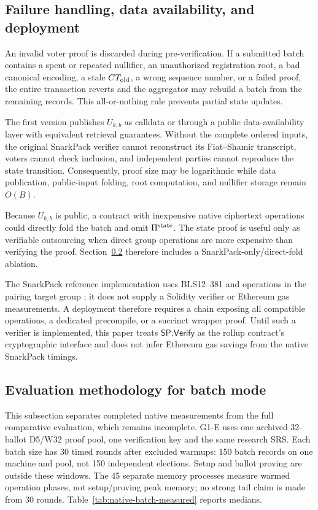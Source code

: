 \documentclass[pdflatex,sn-mathphys-num]{sn-jnl}%
\theoremstyle{thmstyleone}%
\theoremstyle{thmstyletwo}%
\theoremstyle{thmstylethree}%
\begin{document}
\subsection{Failure handling, data availability, and deployment}\label{subsec:batch-failures}

An invalid voter proof is discarded during pre-verification. If a submitted batch contains a spent or repeated nullifier, an unauthorized registration root, a bad canonical encoding, a stale $CT_{\rm old}$, a wrong sequence number, or a failed proof, the entire transaction reverts and the aggregator may rebuild a batch from the remaining records. This all-or-nothing rule prevents partial state updates.

The first version publishes $U_{k,b}$ as calldata or through a public data-availability layer with equivalent retrieval guarantees. Without the complete ordered inputs, the original SnarkPack verifier cannot reconstruct its Fiat--Shamir transcript, voters cannot check inclusion, and independent parties cannot reproduce the state transition. Consequently, proof size may be logarithmic while data publication, public-input folding, root computation, and nullifier storage remain $O(B)$.

Because $U_{k,b}$ is public, a contract with inexpensive native ciphertext operations could directly fold the batch and omit $\Pi^{\rm state}$. The state proof is useful only as verifiable outsourcing when direct group operations are more expensive than verifying the proof. Section~\ref{subsec:batch-evaluation} therefore includes a SnarkPack-only/direct-fold ablation.

The SnarkPack reference implementation uses BLS12--381 and operations in the pairing target group \cite{bib128}; it does not supply a Solidity verifier or Ethereum gas measurements. A deployment therefore requires a chain exposing all compatible operations, a dedicated precompile, or a succinct wrapper proof. Until such a verifier is implemented, this paper treats $\mathsf{SP.Verify}$ as the rollup contract's cryptographic interface and does not infer Ethereum gas savings from the native SnarkPack timings.

\subsection{Evaluation methodology for batch mode}\label{subsec:batch-evaluation}

This subsection separates completed native measurements from the full
comparative evaluation, which remains incomplete. G1-E uses one archived
32-ballot D5/W32 proof pool, one verification key and the same research SRS.
Each batch size has 30 timed rounds after excluded warmups: 150 batch records
on one machine and pool, not 150 independent elections. Setup and ballot
proving are outside these windows. The 45 separate memory processes measure
warmed operation phases, not setup/proving peak memory; no strong tail claim
is made from 30 rounds. Table~\ref{tab:native-batch-measured} reports medians.
\end{document}
